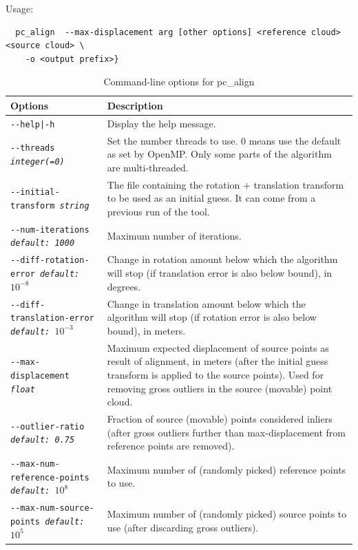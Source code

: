 \medskip

Usage:\\
\begin{verbatim}
  pc_align  --max-displacement arg [other options] <reference cloud> <source cloud> \
    -o <output prefix>}
\end{verbatim}

\medskip

\begin{longtable}{|p{8cm}|p{9cm}|}
\caption{Command-line options for pc\_align}
\label{tbl:pcalign}
\endfirsthead
\endhead
\endfoot
\endlastfoot
\hline
Options & Description \\ \hline \hline
\texttt{-\/-help|-h} & Display the help message.\\ \hline
\texttt{-\/-threads \textit{integer(=0)}} & Set the number threads to
use. 0 means use the default as set by OpenMP. Only some parts of the algorithm are multi-threaded.\\ \hline
\texttt{-\/-initial-transform \textit{string}} &
The file containing the rotation + translation transform to be used as an
initial guess. It can come from a previous run of the tool. \\ \hline
\texttt{-\/-num-iterations \textit{default: 1000}} &  Maximum number of iterations. \\ \hline
\texttt{-\/-diff-rotation-error \textit{default: $10^{-8}$}} & Change in rotation amount below which the algorithm will stop (if translation error is also below bound), in degrees. \\ \hline
\texttt{-\/-diff-translation-error \textit{default: $10^{-3}$}} & Change in translation amount below which the algorithm will stop (if rotation error is also below bound), in meters. \\ \hline
\texttt{-\/-max-displacement \textit{float}} & Maximum expected
displacement of source points as result of alignment, in meters (after
the initial guess transform is applied to the source points). Used
for removing gross outliers in the source (movable) point cloud.\\ \hline
\texttt{-\/-outlier-ratio \textit{default: 0.75}} &  Fraction of source (movable) points considered inliers (after gross outliers further than max-displacement from reference points are removed). \\ \hline
\texttt{-\/-max-num-reference-points \textit{default: $10^8$}} &
Maximum number of (randomly picked) reference points to use. \\ \hline
\texttt{-\/-max-num-source-points \textit{default: $10^5$}} & Maximum number of (randomly picked) source points to use (after discarding gross outliers). \\ \hline

\end{longtable}
